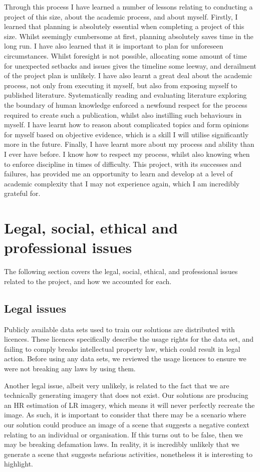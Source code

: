 \begin{appendices}
Through this process I have learned a number of lessons relating to conducting a project of this size, about the academic process, and about myself. Firstly, I learned that planning is absolutely essential when completing a project of this size. Whilst seemingly cumbersome at first, planning absolutely saves time in the long run. I have also learned that it is important to plan for unforeseen circumstances. Whilst foresight is not possible, allocating some amount of time for unexpected setbacks and issues gives the timeline some leeway, and derailment of the project plan is unlikely. I have also learnt a great deal about the academic process, not only from executing it myself, but also from exposing myself to published literature. Systematically reading and evaluating literature exploring the boundary of human knowledge enforced a newfound respect for the process required to create such a publication, whilst also instilling such behaviours in myself. I have learnt how to reason about complicated topics and form opinions for myself based on objective evidence, which is a skill I will utilise significantly more in the future. Finally, I have learnt more about my process and ability than I ever have before. I know how to respect my process, whilst also knowing when to enforce discipline in times of difficulty. This project, with its successes and failures, has provided me an opportunity to learn and develop at a level of academic complexity that I may not experience again, which I am incredibly grateful for.

\section{Legal, social, ethical and professional issues}
The following section covers the legal, social, ethical, and professional issues related to the project, and how we accounted for each.

\subsection{Legal issues}
Publicly available data sets used to train our solutions are distributed with licences. These licences specifically describe the usage rights for the data set, and failing to comply breaks intellectual property law, which could result in legal action. Before using any data sets, we reviewed the usage licences to ensure we were not breaking any laws by using them.

Another legal issue, albeit very unlikely, is related to the fact that we are technically generating imagery that does not exist. Our solutions are producing an HR estimation of LR imagery, which means it will never perfectly recreate the image. As such, it is important to consider that there may be a scenario where our solution could produce an image of a scene that suggests a negative context relating to an individual or organisation. If this turns out to be false, then we may be breaking defamation laws. In reality, it is incredibly unlikely that we generate a scene that suggests nefarious activities, nonetheless it is interesting to highlight.


\end{appendices}
